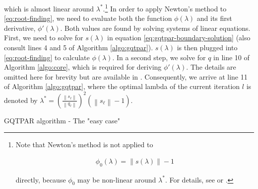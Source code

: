 \noindent which is almost linear around $\lambda^*$.\footnote{Note that Newton's method is not applied to

\begin{align}
    \phi_0 (\lambda) = \lVert s (\lambda) \rVert - 1
\end{align}

\noindent directly, because $\phi_0$ may be non-linear around $\lambda^*$. For details, see \cite{More1983} or \cite{Nocedal2006}.}
In order to apply Newton's method to \ref{eq:root-finding}, we need to evaluate both the function $\phi(\lambda)$ and its first derivative, $\phi'(\lambda)$. Both values are found by solving systems of linear equations.
First, we need to solve for $s(\lambda)$ in equation \ref{eq:gqtpar-boundary-solution} (also consult lines 4 and 5 of Algorithm \ref{algo:gqtpar}). $s(\lambda)$ is then plugged into \ref{eq:root-finding} to calculate $\phi(\lambda)$.
In a second step, we solve for $q$ in line 10 of Algorithm \ref{algo:core}, which is required for deriving $\phi'(\lambda)$. The details are omitted here for brevity but are available in \cite{Conn2000}. Consequently, we arrive at line 11 of Algorithm \ref{algo:gqtpar}, where the optimal lambda of the current iteration $l$ is denoted by $\lambda^* =\left(\frac{\left\|s_{\ell}\right\|}{\left\|q_{\ell}\right\|}\right)^2\left(\left\|s_{\ell}\right\|- 1 \right)$.


\begin{algorithm}
    \caption{GQTPAR algorithm - The "easy case"} \label{algo:gqtpar}
    \For{$\ell$=0,1,2,...}{

        Safeguard $\lambda^{(l)}$ to obtain $\lambda^{(\ell)}_S$ \\
        \If{$H + \lambda^{(\ell)} I$ is positive definite}{
            Factor $H + \lambda^{(l)} I = R^T \ R$ \\
            Solve $s_\ell = - (R^T R)^{-1} g $ \\
                }
                Update $\lambda^{(\ell)}_L$, $\lambda^{(\ell)}_U$, $\lambda^{(\ell)}_S$ \\
                Check convergence criteria \\
                \uIf{$H + \lambda^{(l)} I$ is positive definite and $g \neq 0$ }{
                    Solve $q_\ell = (R^T)^{-1} s_\ell $ \\
                    Set $\lambda^{(\ell+1)}=\lambda^{(\ell)}+\left(\frac{\left\|s_{\ell}\right\|}{\left\|q_{\ell}\right\|}\right)^2\left(\left\|s_{\ell}\right\|- 1 \right)$
                    }
                    \uElse{
                        Set $\lambda^{(\ell + 1)} = \lambda^{(\ell)}_S$
                        }
                        }
                    \end{algorithm}

